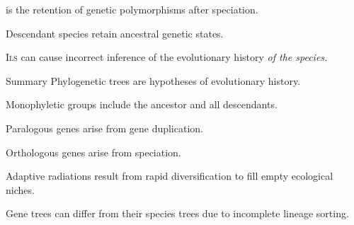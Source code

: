 \documentclass[t]{beamer}
\begin{document}
%
\begin{frame}[t,plain]{ is the retention of genetic polymorphisms after speciation.}

	\hangpara Descendant species retain ancestral genetic states.
	
	\hangpara I\textsc{ls} can cause incorrect inference of the evolutionary history \emph{of the species.}

\end{frame}
%

\begin{frame}[t,plain]{Summary}
\hangpara Phylogenetic trees are hypotheses of evolutionary history.

\hangpara Monophyletic groups include the ancestor and all descendants.

\hangpara Paralogous genes arise from gene duplication.

\hangpara Orthologous genes arise from speciation.

\hangpara Adaptive radiations result from rapid diversification to fill empty ecological niches.

\hangpara Gene trees can differ from their species trees due to incomplete lineage sorting.

\end{frame}
\end{document}
